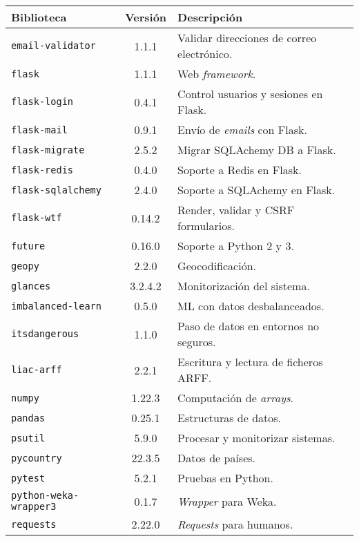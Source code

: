 \begin{table}[p]
\centering
\begin{tabular}{lcl}
	\textbf{Biblioteca} & \textbf{Versión} & \textbf{Descripción}\\
	\toprule
	\rowcolor[HTML]{EFEFEF} 
	\texttt{email-validator} & 1.1.1 & Validar direcciones de correo electrónico.\\
	\texttt{flask} & 1.1.1 & Web \textit{framework}.\\ \rowcolor[HTML]{EFEFEF}
	\texttt{flask-login} & 0.4.1 & Control usuarios y sesiones en Flask.\\
	\texttt{flask-mail} & 0.9.1 & Envío de \textit{emails} con Flask.\\ \rowcolor[HTML]{EFEFEF}
	\texttt{flask-migrate} & 2.5.2 & Migrar SQLAchemy DB a Flask.\\
	\texttt{flask-redis} & 0.4.0 & Soporte a Redis en Flask.\\ \rowcolor[HTML]{EFEFEF}
	\texttt{flask-sqlalchemy} & 2.4.0 & Soporte a SQLAchemy en Flask.\\
	\texttt{flask-wtf} & 0.14.2 & Render, validar y CSRF formularios.\\ \rowcolor[HTML]{EFEFEF}
	\texttt{future} & 0.16.0 & Soporte a Python 2 y 3.\\ 
	\texttt{geopy} & 2.2.0 & Geocodificación.\\ \rowcolor[HTML]{EFEFEF}
	\texttt{glances} & 3.2.4.2 & Monitorización del sistema.\\ 
	\texttt{imbalanced-learn} & 0.5.0 & ML con datos desbalanceados.\\ \rowcolor[HTML]{EFEFEF}
	\texttt{itsdangerous} & 1.1.0 & Paso de datos en entornos no seguros.\\
	\texttt{liac-arff} & 2.2.1 & Escritura y lectura de ficheros ARFF.\\ \rowcolor[HTML]{EFEFEF}
	\texttt{numpy} & 1.22.3 & Computación de \textit{arrays}.\\
	\texttt{pandas} & 0.25.1 & Estructuras de datos.\\ \rowcolor[HTML]{EFEFEF}
	\texttt{psutil} & 5.9.0 & Procesar y monitorizar sistemas.\\
	\texttt{pycountry} & 22.3.5 & Datos de países.\\ \rowcolor[HTML]{EFEFEF}
	\texttt{pytest} & 5.2.1 & Pruebas en Python.\\
	\texttt{python-weka-wrapper3} & 0.1.7 & \textit{Wrapper} para Weka.\\ \rowcolor[HTML]{EFEFEF}
	\texttt{requests} & 2.22.0 & \textit{Requests} para humanos.\\

\end{tabular}
\end{table}

